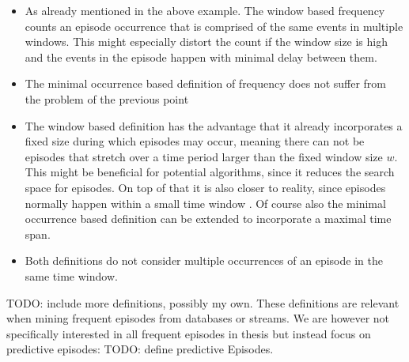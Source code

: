 \begin{itemize}
	\item As already mentioned in the above example. The window based frequency counts an episode occurrence that is comprised of the same events in multiple windows. This might especially distort the count if the window size is high and the events in the episode happen with minimal delay between them.
	\item The minimal occurrence based definition of frequency does not suffer from the problem of the previous point
	\item The window based definition has the advantage that it already incorporates a fixed size during which episodes may occur, meaning there can not be episodes that stretch over a time period larger than the fixed window size $w$. This might be beneficial for potential algorithms, since it reduces the search space for episodes. On top of that it is also closer to reality, since episodes normally happen within a small time window \cite{generatingEpisodeDatasets}. Of course also the minimal occurrence based definition can be extended to incorporate a maximal time span.
	\item Both definitions do not consider multiple occurrences of an episode in the same time window.
\end{itemize}

TODO: include more definitions, possibly my own. \newline \newline
These definitions are relevant when mining frequent episodes from databases or streams. We are however not specifically interested in all frequent episodes in thesis but instead focus on predictive episodes: TODO: define predictive Episodes.

